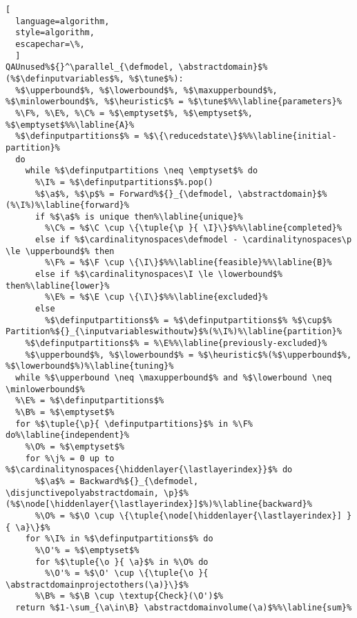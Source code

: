 {\begin{marginalgorithm}[*-13]
  \caption{Parallel Implementation $\parallelqlibra$}
\begin{lstlisting}[
  language=algorithm,
  style=algorithm,
  escapechar=\%,
  ]
QAUnused%${}^\parallel_{\defmodel, \abstractdomain}$%(%$\definputvariables$%, %$\tune$%):
  %$\upperbound$%, %$\lowerbound$%, %$\maxupperbound$%, %$\minlowerbound$%, %$\heuristic$% = %$\tune$%%\labline{parameters}%
  %\F%, %\E%, %\C% = %$\emptyset$%, %$\emptyset$%, %$\emptyset$%%\labline{A}%
  %$\definputpartitions$% = %$\{\reducedstate\}$%%\labline{initial-partition}%
  do
    while %$\definputpartitions \neq \emptyset$% do
      %\I% = %$\definputpartitions$%.pop()
      %$\a$%, %$\p$% = Forward%${}_{\defmodel, \abstractdomain}$%(%\I%)%\labline{forward}%
      if %$\a$% is unique then%\labline{unique}%
        %\C% = %$\C \cup \{\tuple{\p }{ \I}\}$%%\labline{completed}%
      else if %$\cardinalitynospaces\defmodel - \cardinalitynospaces\p \le \upperbound$% then
        %\F% = %$\F \cup \{\I\}$%%\labline{feasible}%%\labline{B}%
      else if %$\cardinalitynospaces\I \le \lowerbound$% then%\labline{lower}%
        %\E% = %$\E \cup \{\I\}$%%\labline{excluded}%
      else
        %$\definputpartitions$% = %$\definputpartitions$% %$\cup$% Partition%${}_{\inputvariableswithoutw}$%(%\I%)%\labline{partition}%
    %$\definputpartitions$% = %\E%%\labline{previously-excluded}%
    %$\upperbound$%, %$\lowerbound$% = %$\heuristic$%(%$\upperbound$%, %$\lowerbound$%)%\labline{tuning}%
  while %$\upperbound \neq \maxupperbound$% and %$\lowerbound \neq \minlowerbound$%
  %\E% = %$\definputpartitions$%
  %\B% = %$\emptyset$%
  for %$\tuple{\p}{ \definputpartitions}$% in %\F% do%\labline{independent}%
    %\O% = %$\emptyset$%
    for %\j% = 0 up to %$\cardinalitynospaces{\hiddenlayer{\lastlayerindex}}$% do
      %$\a$% = Backward%${}_{\defmodel, \disjunctivepolyabstractdomain, \p}$%(%$\node[\hiddenlayer{\lastlayerindex}]$%)%\labline{backward}%
      %\O% = %$\O \cup \{\tuple{\node[\hiddenlayer{\lastlayerindex}] }{ \a}\}$%
    for %\I% in %$\definputpartitions$% do
      %\O'% = %$\emptyset$%
      for %$\tuple{\o }{ \a}$% in %\O% do
        %\O'% = %$\O' \cup \{\tuple{\o }{ \abstractdomainprojectothers(\a)}\}$%
      %\B% = %$\B \cup \textup{Check}(\O')$%
  return %$1-\sum_{\a\in\B} \abstractdomainvolume(\a)$%%\labline{sum}%
\end{lstlisting}
\end{marginalgorithm}

}
